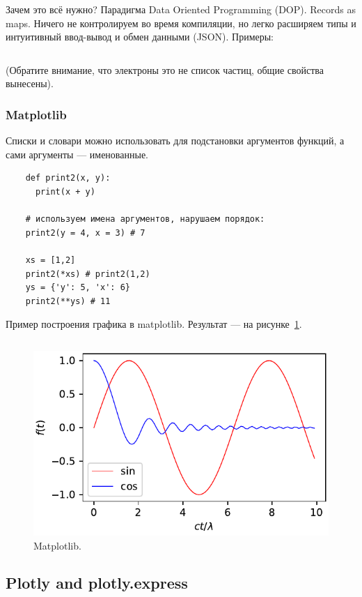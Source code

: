 \documentclass{book}
\begin{document}
Зачем это всё нужно? Парадигма Data Oriented Programming (DOP). Records as maps. Ничего не контролируем во время компиляции, но
легко расширяем типы и интуитивный ввод-вывод и обмен данными (JSON). Примеры:
\inputminted{python}{romanNumbers.py}

(Обратите внимание, что электроны это не список частиц, общие свойства вынесены).

\subsubsection{Matplotlib}

Списки и словари можно использовать для подстановки аргументов функций, а сами аргументы --- именованные.
\begin{verbatim}
    def print2(x, y):
      print(x + y)
 
    # используем имена аргументов, нарушаем порядок:
    print2(y = 4, x = 3) # 7
 
    xs = [1,2]
    print2(*xs) # print2(1,2)
    ys = {'y': 5, 'x': 6}
    print2(**ys) # 11
\end{verbatim}

Пример построения графика в matplotlib. Результат --- на рисунке~\ref{simple_matplotlib_plot}.
\inputminted{python}{simple_matplotlib_plot.py}

\begin{figure}
	\includegraphics[width=1\linewidth]{simple_matplotlib_plot.pdf}
    \caption{\label{simple_matplotlib_plot}Matplotlib.}
\end{figure}

\subsection{Plotly and plotly.express}
\end{document}
